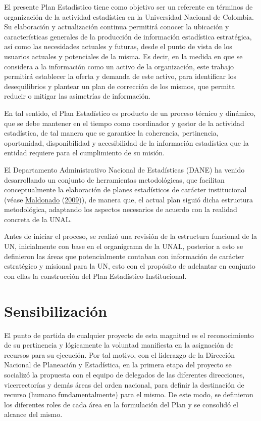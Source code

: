 \documentclass[
]{book}
\begin{document}
El presente Plan Estadístico tiene como objetivo ser un referente en términos de organización de
la actividad estadística en la Universidad Nacional de Colombia. Su elaboración y actualización continua permitirá conocer la
ubicación y características generales de la producción de información estadística estratégica, así
como las necesidades actuales y futuras, desde el punto de vista de los usuarios actuales y
potenciales de la misma. Es decir, en la medida en que se considera a la información como un activo de la organización, este trabajo permitirá establecer la oferta y demanda de este activo,
para identificar los desequilibrios y plantear un plan de corrección de los mismos, que permita
reducir o mitigar las asimetrías de información.

En tal sentido, el Plan Estadístico es producto de un proceso técnico y dinámico, que se debe
mantener en el tiempo como coordinador y gestor de la actividad estadística, de tal manera que
se garantice la coherencia, pertinencia, oportunidad, disponibilidad y accesibilidad de la
información estadística que la entidad requiere para el cumplimiento de su misión.

El Departamento Administrativo Nacional de Estadísticas (DANE) ha venido desarrollando un
conjunto de herramientas metodológicas, que facilitan conceptualmente la elaboración de planes
estadísticos de carácter institucional (véase \protect\hyperlink{ref-maldonado2009metodologia}{Maldonado} (\protect\hyperlink{ref-maldonado2009metodologia}{2009})), de manera que, el actual plan siguió dicha estructura
metodológica, adaptando los aspectos necesarios de acuerdo con la realidad concreta de la UNAL.

Antes de iniciar el proceso, se realizó una revisión de la estructura funcional de la UN, inicialmente
con base en el organigrama de la UNAL, posterior a esto se definieron las áreas que potencialmente
contaban con información de carácter estratégico y misional para la UN, esto con el propósito de
adelantar en conjunto con ellas la construcción del Plan Estadístico Institucional.

\hypertarget{sensibilizaciuxf3n}{%
\section{Sensibilización}\label{sensibilizaciuxf3n}}

El punto de partida de cualquier proyecto de esta magnitud es el reconocimiento de su pertinencia
y lógicamente la voluntad manifiesta en la asignación de recursos para su ejecución. Por tal
motivo, con el liderazgo de la Dirección Nacional de Planeación y Estadística, en la primera etapa
del proyecto se socializó la propuesta con el equipo de delegados de las diferentes direcciones,
vicerrectorías y demás áreas del orden nacional, para definir la destinación de recurso (humano
fundamentalmente) para el mismo. De este modo, se definieron los diferentes roles de cada área
en la formulación del Plan y se consolidó el alcance del mismo.
\end{document}
